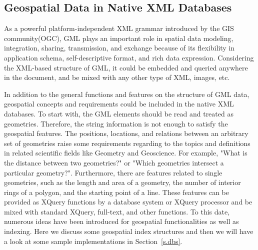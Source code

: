 \documentclass[a4paper,12pt]{article}
\begin{document}
\subsection{Geospatial Data in Native XML Databases}
\label{s.geo-data-in-xml-data}
As a powerful platform-independent XML grammar introduced by the GIS community(OGC), GML plays an important role in spatial data modeling, integration, sharing, transmission, and exchange because of its flexibility in application schema, self-descriptive format, and rich data expression. Considering the XML-based structure of GML, it could be embedded and queried anywhere in the document, and be mixed with any other type of XML, images, etc. 

In addition to the general functions and features on the structure of GML data, geospatial concepts and requirements could be included in the native XML databases. To start with, the GML elements should be read and treated as geometries. Therefore, the string information is not enough to satisfy the geospatial features. The positions, locations, and relations between an arbitrary set of geometries raise some requirements regarding to the topics and definitions in related scientific fields like Geometry and Geoscience. For example, "What is the distance between two geometries?" or "Which geometries intersect a particular geometry?". Furthermore, there are features related to single geometries, such as the length and area of a geometry, the number of interior rings of a polygon, and the starting point of a line. These features can be provided as XQuery functions by a database system or XQuery processor and be mixed with standard XQuery, full-text, and other functions.
To this date, numerous ideas have been introduced for geospatial functionalities as well as indexing. Here we discuss some geospatial index structures and then we will have a look at some sample implementations in Section~\ref{s.dbs}.


\end{document}
